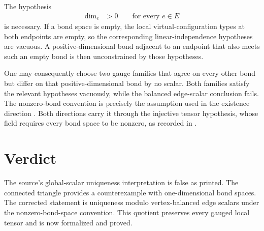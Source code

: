 \documentclass{article}
\begin{document}
The hypothesis
\begin{align}
    \dim_e
        &> 0
        \qquad\text{for every }e\in E
    \label{eq:peps_gauge_edge_scalars_positive_bond_dimension}
\end{align}
is necessary. If a bond space is empty, the local virtual-configuration types
at both endpoints are empty, so the corresponding linear-independence
hypotheses are vacuous. A positive-dimensional bond adjacent to an endpoint
that also meets such an empty bond is then unconstrained by those hypotheses.

One may consequently choose two gauge families that agree on every other bond
but differ on that positive-dimensional bond by no scalar. Both families
satisfy the relevant hypotheses vacuously, while the balanced edge-scalar
conclusion fails. The nonzero-bond convention is precisely the assumption
used in the existence direction .
Both directions carry it through the injective tensor hypothesis, whose field
 requires every bond space
to be nonzero, as recorded in
.

\section{Verdict}

The source's global-scalar uniqueness interpretation is false as printed. The
connected triangle provides a counterexample with one-dimensional bond spaces.
The corrected statement is uniqueness modulo vertex-balanced edge scalars
under the nonzero-bond-space convention. This quotient preserves every gauged
local tensor and is now formalized and proved.



\end{document}

